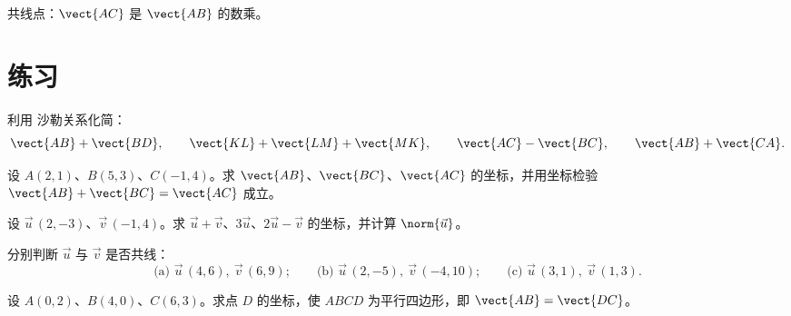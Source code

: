 \begin{omfigure}

{\small 共线点：$\vect{AC}$ 是 $\vect{AB}$ 的数乘。}
\end{omfigure}

\section{练习}

\begin{exercise}[$\star$]\label{exo:g10:vectors:1}
利用 沙勒关系化简：
\[
\vect{AB} + \vect{BD}, \qquad
\vect{KL} + \vect{LM} + \vect{MK}, \qquad
\vect{AC} - \vect{BC}, \qquad
\vect{AB} + \vect{CA}.
\]
\end{exercise}

\begin{exercise}[$\star$]\label{exo:g10:vectors:2}
设 $A(2, 1)$、$B(5, 3)$、$C(-1, 4)$。求
$\vect{AB}$、$\vect{BC}$、$\vect{AC}$ 的坐标，并用坐标检验
$\vect{AB} + \vect{BC} = \vect{AC}$ 成立。
\end{exercise}

\begin{exercise}[$\star$]\label{exo:g10:vectors:3}
设 $\vec u\,(2, -3)$、$\vec v\,(-1, 4)$。求
$\vec u + \vec v$、$3\vec u$、$2\vec u - \vec v$ 的坐标，并计算
$\norm{\vec u}$。
\end{exercise}

\begin{exercise}[$\star$]\label{exo:g10:vectors:4}
分别判断 $\vec u$ 与 $\vec v$ 是否共线：
\[
\text{(a) } \vec u\,(4, 6),\ \vec v\,(6, 9);
\qquad
\text{(b) } \vec u\,(2, -5),\ \vec v\,(-4, 10);
\qquad
\text{(c) } \vec u\,(3, 1),\ \vec v\,(1, 3).
\]
\end{exercise}

\begin{exercise}[$\star$]\label{exo:g10:vectors:5}
设 $A(0, 2)$、$B(4, 0)$、$C(6, 3)$。求点
$D$ 的坐标，使 $ABCD$ 为平行四边形，即
$\vect{AB} = \vect{DC}$。
\end{exercise}

